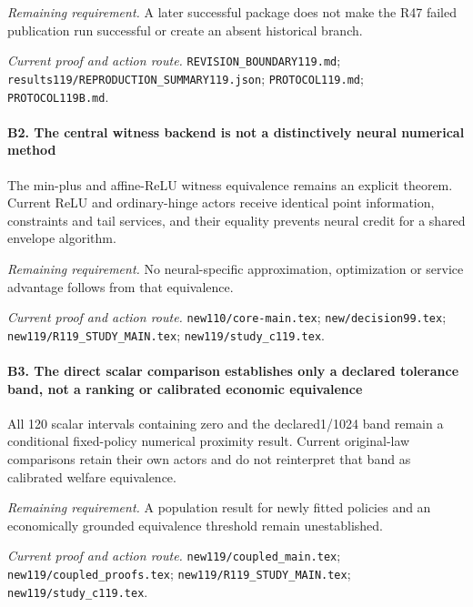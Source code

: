 \par\emph{Remaining requirement.} A later successful package does not make the R47 failed publication run successful or create an absent historical branch.

\par\emph{Current proof and action route.} \nolinkurl{REVISION_BOUNDARY119.md}; \nolinkurl{results119/REPRODUCTION_SUMMARY119.json}; \nolinkurl{PROTOCOL119.md}; \nolinkurl{PROTOCOL119B.md}.

\paragraph{B2. The central witness backend is not a distinctively neural numerical method}

The min-plus and affine-ReLU witness equivalence remains an explicit theorem. Current ReLU and ordinary-hinge actors receive identical point information, constraints and tail services, and their equality prevents neural credit for a shared envelope algorithm.

\par\emph{Remaining requirement.} No neural-specific approximation, optimization or service advantage follows from that equivalence.

\par\emph{Current proof and action route.} \nolinkurl{new110/core-main.tex}; \nolinkurl{new/decision99.tex}; \nolinkurl{new119/R119_STUDY_MAIN.tex}; \nolinkurl{new119/study_c119.tex}.

\paragraph{B3. The direct scalar comparison establishes only a declared tolerance band, not a ranking or calibrated economic equivalence}

All 120 scalar intervals containing zero and the declared1/1024 band remain a conditional fixed-policy numerical proximity result. Current original-law comparisons retain their own actors and do not reinterpret that band as calibrated welfare equivalence.

\par\emph{Remaining requirement.} A population result for newly fitted policies and an economically grounded equivalence threshold remain unestablished.

\par\emph{Current proof and action route.} \nolinkurl{new119/coupled_main.tex}; \nolinkurl{new119/coupled_proofs.tex}; \nolinkurl{new119/R119_STUDY_MAIN.tex}; \nolinkurl{new119/study_c119.tex}.

